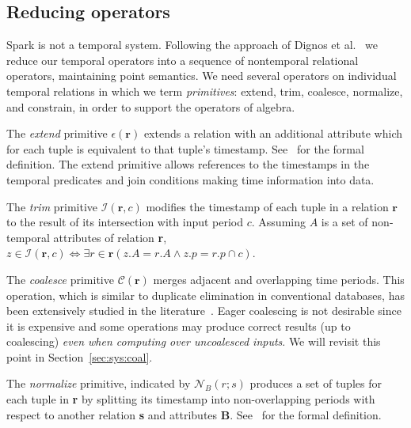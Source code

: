 \subsection{Reducing operators}
\label{sec:props:reduce}

Spark is not a temporal system.  Following the approach of Dignos et
al.~\cite{Dignos2012} we reduce our temporal operators into a sequence
of nontemporal relational operators, maintaining point semantics.  We
need several operators on individual temporal relations in \tve which
we term {\em primitives}: extend, trim, coalesce, normalize, and
constrain, in order to support the operators of \ql algebra.


The {\em extend} primitive $\epsilon(\mathbf{r})$ extends a relation
with an additional attribute which for each tuple is equivalent to
that tuple's timestamp.  See~\cite{Dignos2012} for the formal
definition.  The extend primitive allows references to the timestamps
in the temporal predicates and join conditions making time information
into data.

The {\em trim} primitive $\mathcal{I}(\mathbf{r},c)$ modifies the
timestamp of each tuple in a relation $\mathbf{r}$ to the result of
its intersection with input period $c$.  Assuming $A$ is a set of
non-temporal attributes of relation {\bf r}, $z \in
\mathcal{I}(\mathbf{r},c) \iff \exists r \in \mathbf{r}(z.A = r.A
\wedge z.p = r.p \cap c)$.

The {\em coalesce} primitive $\mathcal{C}(\mathbf{r})$ merges adjacent
and overlapping time periods.  This operation, which is similar to
duplicate elimination in conventional databases, has been extensively
studied in the
literature~\cite{DBLP:conf/vldb/BohlenSS96,DBLP:journals/sigmod/Zimanyi06}.
Eager coalescing is not desirable since it is expensive and some
operations may produce correct results (up to coalescing) {\em even
  when computing over uncoalesced inputs}.  We will revisit this point in
Section~\ref{sec:sys:coal}.

The {\em normalize} primitive, indicated by $\mathcal{N}_B(r;s)$
produces a set of tuples for each tuple in {\bf r} by splitting its
timestamp into non-overlapping periods with respect to another
relation {\bf s} and attributes {\bf B}.  See~\cite{Dignos2012} for
the formal definition.

